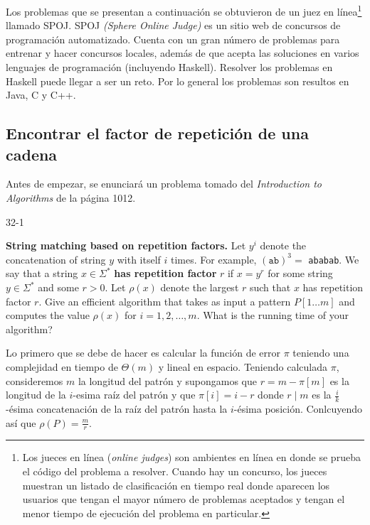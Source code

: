 Los problemas que se presentan a continuación se obtuvieron de un juez en línea\footnote{
    Los jueces en línea (\textit{online judges}) son ambientes en línea en donde se prueba el
    código del problema a resolver. Cuando hay un concurso, los jueces muestran 
un listado de
    clasificación en tiempo real donde aparecen los usuarios que tengan el mayor número de
    problemas aceptados y tengan el menor tiempo de ejecución del problema en particular.
} llamado {\selectfont SPOJ}.
{\selectfont SPOJ} \textit{(Sphere Online Judge)} es un sitio web de concursos
de programación automatizado. Cuenta con un gran número de problemas para entrenar y hacer
concursos locales, además de que acepta las soluciones en varios lenguajes de programación
(incluyendo Haskell). Resolver los problemas en Haskell puede llegar a ser un reto.
Por lo general los problemas son resultos en Java, C y C++.

\subsection{Encontrar el factor de repetición de una cadena}
Antes de empezar, se enunciará un problema tomado del
\emph{Introduction to Algorithms}\cite{cormen_2009} de la página 1012.

\begin{tcolorbox}
\hypertarget{repetitions-facor}{32-1}   
\textbf{String matching based on repetition factors.}
Let $y^i$ denote the concatenation of string $y$ with itself $i$ times. For example,
$(\texttt{ab})^3 =$ \texttt{ababab}. We say that a string $x \in \Sigma^*$
\textbf{has repetition factor} $r$ if $x = y^r$ for some string $y \in \Sigma^*$ and some $r > 0$.
Let $\rho(x)$ denote the largest $r$ such that $x$ has repetition factor $r$.
Give an efficient algorithm that takes as input a pattern $P[1 \ldots m]$ and computes the value
$\rho(x)$ for $i = 1,2,\ldots,m$. What is the running time of your algorithm?
\end{tcolorbox}
    
Lo primero que se debe de hacer es calcular la función de error $\pi$ teniendo una complejidad en
tiempo de $\Theta(m)$ y lineal en espacio. Teniendo calculada $\pi$, consideremos $m$ la longitud
del patrón y supongamos que $r = m - \pi[m]$ es la longitud de la $i$-esima raíz del patrón y que
$\pi[i] = i - r$ donde $r \mid m$ es la $\frac{i}{k}$-ésima concatenación de la raíz del patrón
hasta la $i$-ésima posición. Conlcuyendo así que $\rho(P) = \frac{m}{r}$.


